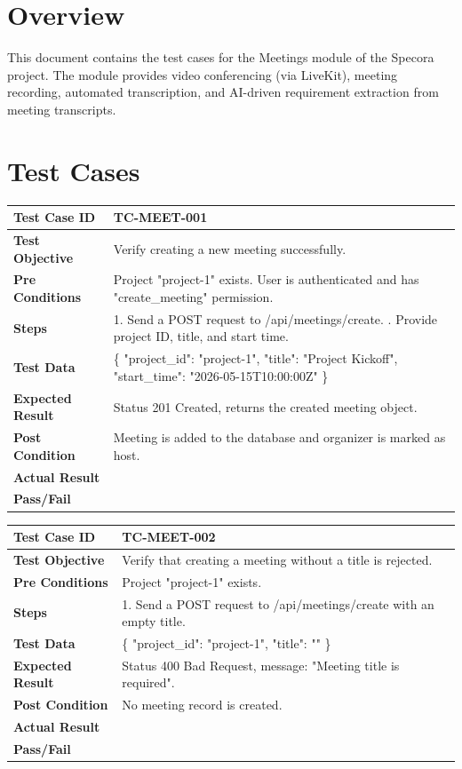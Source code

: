 \section{Overview}
This document contains the test cases for the Meetings module of the Specora project. The module provides video conferencing (via LiveKit), meeting recording, automated transcription, and AI-driven requirement extraction from meeting transcripts.

\section{Test Cases}

\begin{longtable}{|p{}|p{}|}
\hline
\textbf{Test Case ID} & TC-MEET-001 \\ \hline
\textbf{Test Objective} & Verify creating a new meeting successfully. \\ \hline
\textbf{Pre Conditions} & Project "project-1" exists. User is authenticated and has "create_meeting" permission. \\ \hline
\textbf{Steps} & 
1. Send a POST request to /api/meetings/create. \newline
2. Provide project ID, title, and start time. \\ \hline
\textbf{Test Data} & \{ "project_id": "project-1", "title": "Project Kickoff", "start_time": "2026-05-15T10:00:00Z" \} \\ \hline
\textbf{Expected Result} & Status 201 Created, returns the created meeting object. \\ \hline
\textbf{Post Condition} & Meeting is added to the database and organizer is marked as host. \\ \hline
\textbf{Actual Result} &  \\ \hline
\textbf{Pass/Fail} &  \\ \hline
\end{longtable}

\begin{longtable}{|p{}|p{}|}
\hline
\textbf{Test Case ID} & TC-MEET-002 \\ \hline
\textbf{Test Objective} & Verify that creating a meeting without a title is rejected. \\ \hline
\textbf{Pre Conditions} & Project "project-1" exists. \\ \hline
\textbf{Steps} & 
1. Send a POST request to /api/meetings/create with an empty title. \\ \hline
\textbf{Test Data} & \{ "project_id": "project-1", "title": "" \} \\ \hline
\textbf{Expected Result} & Status 400 Bad Request, message: "Meeting title is required". \\ \hline
\textbf{Post Condition} & No meeting record is created. \\ \hline
\textbf{Actual Result} &  \\ \hline
\textbf{Pass/Fail} &  \\ \hline
\end{longtable}

